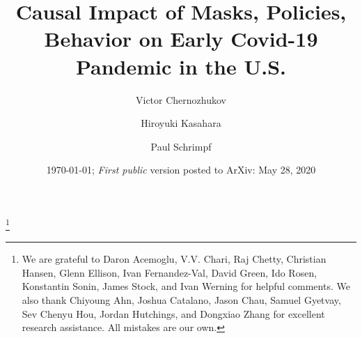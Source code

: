 \documentclass[11pt,reqno,letter]{amsart}
\theoremstyle{definition}
\begin{document}
\title[Causal Impact of Masks, Policies, Behavior]
{Causal Impact of Masks, Policies, Behavior on Early Covid-19 Pandemic in the U.S.}\thanks{We are grateful to Daron Acemoglu, V.V. Chari, Raj Chetty,  Christian Hansen, Glenn Ellison, Ivan Fernandez-Val, David Green,  Ido Rosen, Konstantin Sonin, James Stock, and Ivan Werning for helpful comments. We also thank Chiyoung Ahn,
Joshua Catalano,  Jason Chau, Samuel Gyetvay, Sev Chenyu Hou,
Jordan Hutchings, and Dongxiao Zhang  for excellent research assistance.  All mistakes are our own. }


\author{Victor Chernozhukov}
\address{Department of Economics and Center for Statistics and Data Science, MIT,  MA 02139}
\author{Hiroyuki Kasahara}
\address{ Vancouver School of Economics, UBC, 6000 Iona Drive, Vancouver, BC.}

\author{Paul Schrimpf}
\address{ Vancouver School of Economics, UBC, 6000 Iona Drive, Vancouver, BC.}


\date{\today; \textit{First public} version posted to ArXiv:  May 28, 2020}

\begin{abstract}
\end{abstract}
\end{document}
